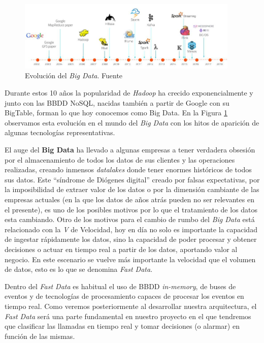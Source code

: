 \begin{figure}[!ht]
	\centering
	\includegraphics[width=0.94\textwidth]{images/arte/bigdatatime}
	\caption{Evolución del \textit{Big Data}. Fuente \cite{lambdakappa}}
	\label{fig:bigdatatime}
\end{figure}


Durante estos 10 años la popularidad de \textit{Hadoop} ha crecido exponencialmente y junto con las BBDD NoSQL, nacidas también a partir de Google con su BigTable, forman lo que hoy conocemos como Big Data. En la Figura \ref{fig:bigdatatime} observamos esta evolución en el mundo del \textit{Big Data} con los hitos de aparición de algunas tecnologías representativas.



El auge del \textbf{Big Data} ha llevado a algunas empresas a tener verdadera obsesión por el almacenamiento de todos los datos de sus clientes y las operaciones realizadas, creando inmensos \textit{datalakes} donde tener enormes históricos de todos sus datos. Este ``síndrome de Diógenes digital'' creado por falsas expectativas, por la imposibilidad de extraer valor de los datos o por la dimensión cambiante de las empresas actuales (en la que los datos de años atrás pueden no ser relevantes en el presente), es uno de los posibles motivos por lo que el tratamiento de los datos esta cambiando. Otro de los motivos para el cambio de rumbo del \textit{Big Data} está relacionado con la \textit{V} de Velocidad, hoy en día no solo es importante la capacidad de ingestar rápidamente los datos, sino la capacidad de poder procesar y obtener decisiones o actuar en tiempo real a partir de los datos, aportando valor al negocio. En este escenario se vuelve más importante la velocidad que el volumen de datos, esto es lo que se denomina \textit{Fast Data}. 



Dentro del \textit{Fast Data} es habitual el uso de BBDD \textit{in-memory}, de buses de eventos y de tecnologías de procesamiento capaces de procesar los eventos en tiempo real. Como veremos posteriormente al desarrollar nuestra arquitectura, el \textit{Fast Data} será una parte fundamental en nuestro proyecto en el que tendremos que clasificar las llamadas en tiempo real y tomar decisiones (o alarmar) en función de las mismas. 

